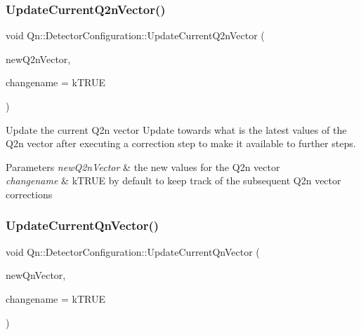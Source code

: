 \subsubsection{\texorpdfstring{Update\+Current\+Q2n\+Vector()}{UpdateCurrentQ2nVector()}}
{\footnotesize\ttfamily void Qn\+::\+Detector\+Configuration\+::\+Update\+Current\+Q2n\+Vector (\begin{DoxyParamCaption}\item[{\mbox{\hyperlink{classQn_1_1CorrectionQnVector}{Correction\+Qn\+Vector}} $\ast$}]{new\+Q2n\+Vector,  }\item[{Bool\+\_\+t}]{changename = {\ttfamily kTRUE} }\end{DoxyParamCaption})\hspace{0.3cm}{\ttfamily [inline]}}

Update the current Q2n vector Update towards what is the latest values of the Q2n vector after executing a correction step to make it available to further steps. 
\begin{DoxyParams}{Parameters}
{\em new\+Q2n\+Vector} & the new values for the Q2n vector \\
\hline
{\em changename} & k\+T\+R\+UE by default to keep track of the subsequent Q2n vector corrections \\
\hline
\end{DoxyParams}
\mbox{\label{classQn_1_1DetectorConfiguration_a6e7228b694e8a1a15290c711f870a527}} 
\subsubsection{\texorpdfstring{Update\+Current\+Qn\+Vector()}{UpdateCurrentQnVector()}}
{\footnotesize\ttfamily void Qn\+::\+Detector\+Configuration\+::\+Update\+Current\+Qn\+Vector (\begin{DoxyParamCaption}\item[{\mbox{\hyperlink{classQn_1_1CorrectionQnVector}{Correction\+Qn\+Vector}} $\ast$}]{new\+Qn\+Vector,  }\item[{Bool\+\_\+t}]{changename = {\ttfamily kTRUE} }\end{DoxyParamCaption})\hspace{0.3cm}{\ttfamily [inline]}}

